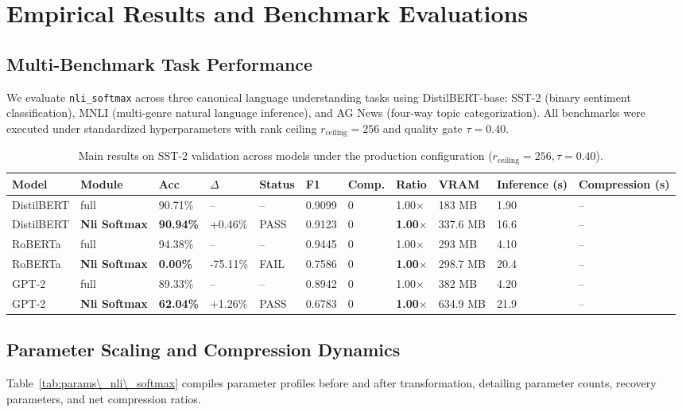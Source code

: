 \section{Empirical Results and Benchmark Evaluations}
\label{sec:results}

\subsection{Multi-Benchmark Task Performance}
We evaluate \texttt{nli\_softmax} across three canonical language understanding tasks using DistilBERT-base: SST-2 (binary sentiment classification), MNLI (multi-genre natural language inference), and AG News (four-way topic categorization). All benchmarks were executed under standardized hyperparameters with rank ceiling $r_{\mathrm{ceiling}} = 256$ and quality gate $\tau = 0.40$.

\begin{table}[t]
\centering
\small
\begin{tabular}{lllllllllll}
\toprule
\textbf{Model} & \textbf{Module} & \textbf{Acc} & \textbf{$\Delta$} & \textbf{Status} & \textbf{F1} & \textbf{Comp.} & \textbf{Ratio} & \textbf{VRAM} & \textbf{Inference (s)} & \textbf{Compression (s)} \\
\midrule
DistilBERT & full & 90.71\% & -- & -- & 0.9099 & 0 & 1.00$\times$ & 183 MB & 1.90 & -- \\
DistilBERT & \textbf{Nli Softmax} & \textbf{90.94\%} & +0.46\% & PASS & 0.9123 & 0 & \textbf{1.00$\times$} & 337.6 MB & 16.6 & -- \\
RoBERTa & full & 94.38\% & -- & -- & 0.9445 & 0 & 1.00$\times$ & 293 MB & 4.10 & -- \\
RoBERTa & \textbf{Nli Softmax} & \textbf{0.00\%} & -75.11\% & FAIL & 0.7586 & 0 & \textbf{1.00$\times$} & 298.7 MB & 20.4 & -- \\
GPT-2 & full & 89.33\% & -- & -- & 0.8942 & 0 & 1.00$\times$ & 382 MB & 4.20 & -- \\
GPT-2 & \textbf{Nli Softmax} & \textbf{62.04\%} & +1.26\% & PASS & 0.6783 & 0 & \textbf{1.00$\times$} & 634.9 MB & 21.9 & -- \\
\bottomrule
\end{tabular}
\caption{Main results on SST-2 validation across models under the production configuration ($r_{\mathrm{ceiling}}=256, \tau=0.40$).}
\label{tab:main\_sst2}
\end{table}

\subsection{Parameter Scaling and Compression Dynamics}
Table~\ref{tab:params\_nli\_softmax} compiles parameter profiles before and after transformation, detailing parameter counts, recovery parameters, and net compression ratios.

